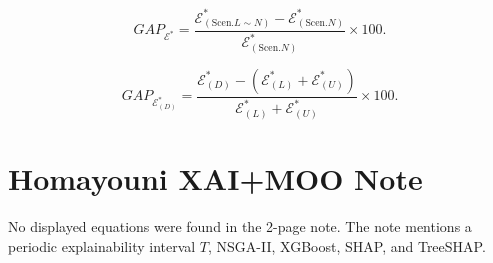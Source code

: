 \documentclass[11pt]{article}
\begin{document}
\begin{equation}
GAP_{\mathcal{E}^{*}}
=
\frac{
    \mathcal{E}_{(\mathrm{Scen.}L\sim N)}^{*}
    -
    \mathcal{E}_{(\mathrm{Scen.}N)}^{*}
}{
    \mathcal{E}_{(\mathrm{Scen.}N)}^{*}
}
\times 100.
\tag{B30}
\end{equation}

\begin{equation}
GAP_{\mathcal{E}_{(D)}^{*}}
=
\frac{
    \mathcal{E}_{(D)}^{*}
    -
    \left(\mathcal{E}_{(L)}^{*}+\mathcal{E}_{(U)}^{*}\right)
}{
    \mathcal{E}_{(L)}^{*}+\mathcal{E}_{(U)}^{*}
}
\times 100.
\tag{B31}
\end{equation}

\section{Homayouni XAI+MOO Note}

No displayed equations were found in the 2-page note. The note mentions a periodic explainability interval \(T\), NSGA-II, XGBoost, SHAP, and TreeSHAP.
\end{document}
